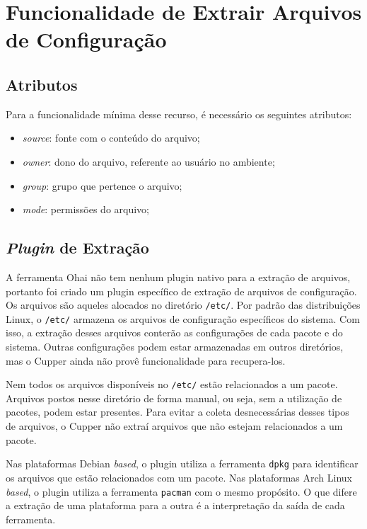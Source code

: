 \section{Funcionalidade de Extrair Arquivos de Configuração}
\label{sec:files}

\subsection{Atributos}

Para a funcionalidade mínima desse recurso, é necessário os seguintes
atributos:

\begin{itemize}
  \item \textit{source}: fonte com o conteúdo do arquivo;
  \item \textit{owner}: dono do arquivo, referente ao usuário no ambiente;
  \item \textit{group}: grupo que pertence o arquivo;
  \item \textit{mode}: permissões do arquivo;
\end{itemize}

\subsection{\textit{Plugin} de Extração}

A ferramenta Ohai não tem nenhum plugin nativo para a extração de arquivos, portanto
foi criado um plugin específico de extração de arquivos de configuração. Os arquivos
são aqueles alocados no diretório \texttt{/etc/}. Por padrão das distribuições Linux,
o \texttt{/etc/} armazena os arquivos de configuração específicos do sistema.
Com isso, a extração desses arquivos conterão as configurações de cada pacote e do
sistema. Outras configurações podem estar armazenadas em outros diretórios,
mas o Cupper ainda não provê funcionalidade para recupera-los. %

Nem todos os arquivos disponíveis no \texttt{/etc/} estão relacionados a um pacote.
Arquivos postos nesse diretório de forma manual, ou seja, sem a utilização de pacotes,
podem estar presentes. Para evitar a coleta desnecessárias desses tipos de arquivos,
o Cupper não extraí arquivos que não estejam relacionados a um pacote.

Nas plataformas Debian \textit{based}, o plugin utiliza a ferramenta \texttt{dpkg}
para identificar os arquivos que estão relacionados com um pacote. Nas plataformas
Arch Linux \textit{based}, o plugin utiliza a ferramenta \texttt{pacman} com o mesmo propósito.
O que difere a extração de uma plataforma para a outra é a interpretação da saída
de cada ferramenta.

